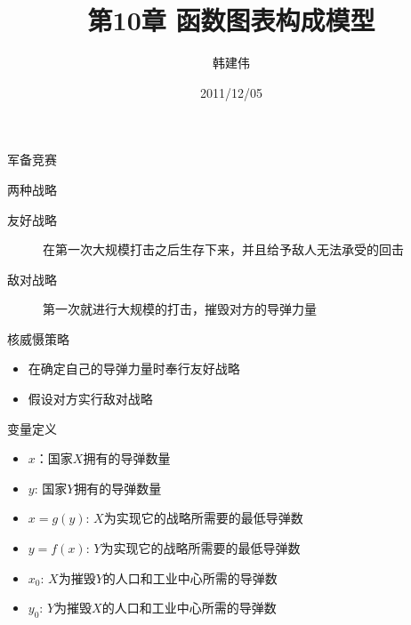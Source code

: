 \documentclass[UTF8]{ctexbeamer}
\title{第10章 函数图表构成模型}
\author{韩建伟}
\institute{
  浙江工商大学信息学院\\
  \texttt{hanjianwei@mail.zjgsu.edu.cn}
}
\date{2011/12/05}
\begin{document}
\begin{frame}[plain]
  \titlepage{}
\end{frame}

\begin{frame}{军备竞赛}
  
  \begin{block}{两种战略}
    \begin{description}
    \item[友好战略] 在第一次大规模打击之后生存下来，并且给予敌人无法承受的回击
    \item[敌对战略] 第一次就进行大规模的打击，摧毁对方的导弹力量
    \end{description}    
  \end{block}

  
  \begin{block}{核威慑策略} 
    \begin{itemize}
    \item 在确定自己的导弹力量时奉行友好战略
    \item 假设对方实行敌对战略
    \end{itemize}
  \end{block}
  
\end{frame}

\begin{frame}{变量定义}
  \begin{itemize}
  \item $x$：国家$X$拥有的导弹数量
  \item $y$: 国家$Y$拥有的导弹数量
  \item $x=g(y)$: $X$为实现它的战略所需要的最低导弹数
  \item $y=f(x)$: $Y$为实现它的战略所需要的最低导弹数
  \item $x_0$: $X$为摧毁$Y$的人口和工业中心所需的导弹数
  \item $y_0$: $Y$为摧毁$X$的人口和工业中心所需的导弹数
  \end{itemize}
\end{frame}
\end{document}
